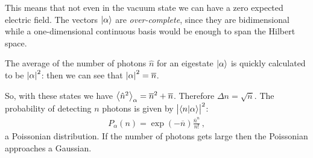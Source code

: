 \documentclass[main.tex]{subfiles}
\begin{document}
This means that not even in the vacuum state we can have a zero expected electric field. The vectors \(\ket{\alpha }\) are \emph{over-complete}, since they are bidimensional while a one-dimensional continuous basis would be enough to span the Hilbert space.

The average of the number of photons \(\hat{n}\) for an eigestate \(\ket{\alpha }\) is quickly calculated to be \(\abs{\alpha }^2\): then we can see that \(\abs{\alpha }^2 = \overline{n}\). 

So, with these states we have \(\expval{\hat{n}^2}_{\alpha } = \overline{n}^2 + \overline{n}\). Therefore \(\Delta n = \sqrt{\overline{n}}\). The probability of detecting \(n\) photons is given by \(\abs{\braket{n}{\alpha }}^2\): 
%
\begin{align}
P_{\alpha }(n) = \exp(- \overline{n} ) \frac{\overline{n}^{n}}{n!}
\,,
\end{align}
%
a Poissonian distribution. If the number of photons gets large then the Poissonian approaches a Gaussian. 
\end{document}
